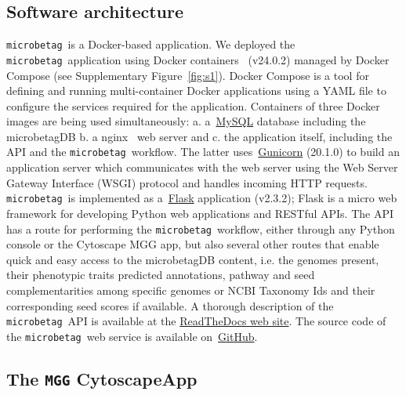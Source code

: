 \documentclass[sn-mathphys,Numbered]{sn-jnl}  %
\theoremstyle{thmstyleone}%
\theoremstyle{thmstyletwo}%
\theoremstyle{thmstylethree}%
\newcommand{\microbetag}{\texttt{microbetag}}
\begin{document}
    \subsection*{Software architecture}
    \label{subsec:webserver}


        \microbetag~is a Docker-based application.
        We deployed the \microbetag~application using Docker containers~\cite{merkel2014docker} (v24.0.2)  managed by Docker Compose (see Supplementary Figure~\ref{fig:s1}).
        Docker Compose is a tool for defining and running multi-container Docker applications using a YAML file to configure the services required for the application.
        Containers of three Docker images are being used simultaneously:
        a. a~\href{https://www.mysql.com}{MySQL} database including the microbetagDB
        b. a nginx~\cite{nginx} web server and 
        c. the application itself, including the API and the \microbetag~workflow.
        The latter uses~\href{https://gunicorn.org}{Gunicorn} (20.1.0) to build an application server which communicates with the web server using the Web Server Gateway Interface (WSGI) protocol and handles incoming HTTP requests.
        \microbetag~is implemented as a~\href{https://flask.palletsprojects.com/en/3.0.x/}{Flask} application (v2.3.2); 
        Flask is a micro web framework for developing Python web applications and RESTful APIs.
        The API has a route for performing the \microbetag~workflow, either through any Python console or the Cytoscape MGG app, but also several other routes that enable quick and easy access to the microbetagDB content, i.e. the genomes present, their phenotypic traits predicted annotations, pathway and seed complementarities among specific genomes or NCBI Taxonomy Ids and their corresponding seed scores if available.
        A thorough description of the \microbetag~API is available at the \href{https://hariszaf.github.io/microbetag/docs/api/}{ReadTheDocs web site}. 
        The source code of the \microbetag~web service is available on~\href{https://github.com/msysbio/microbetagApp/}{GitHub}.


    \subsection*{The \texttt{MGG} CytoscapeApp}
    \label{subsec:build-cytoapp}
\end{document}
